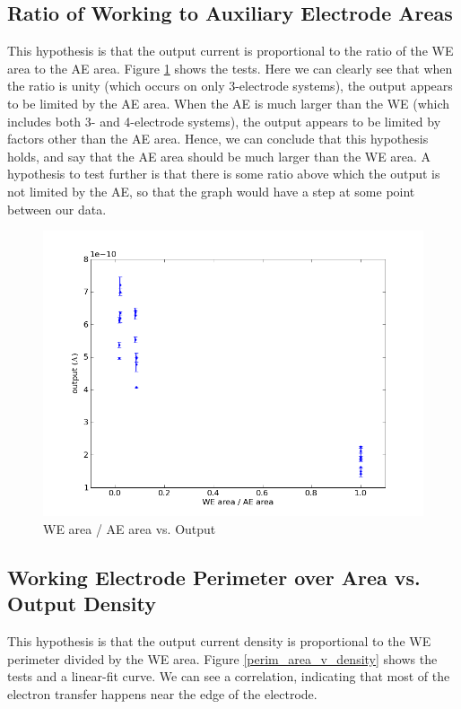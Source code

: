 \subsection{Ratio of Working to Auxiliary Electrode Areas}

This hypothesis is that the output current is proportional to the ratio of the WE area to the AE area. Figure \ref{area_ratio_v_output} shows the tests. Here we can clearly see that when the ratio is unity (which occurs on only 3-electrode systems), the output appears to be limited by the AE area. When the AE is much larger than the WE (which includes both 3- and 4-electrode systems), the output appears to be limited by factors other than the AE area. Hence, we can conclude that this hypothesis holds, and say that the AE area should be much larger than the WE area. A hypothesis to test further is that there is some ratio above which the output is not limited by the AE, so that the graph would have a step at some point between our data.

\begin{figure}
	\centering
	\includegraphics[width=0.7\linewidth]{figures/area_ratio_v_output.png}
	\caption{WE area / AE area vs. Output}
	\label{area_ratio_v_output}
\end{figure}

\subsection{Working Electrode Perimeter over Area vs. Output Density}

This hypothesis is that the output current density is proportional to the WE perimeter divided by the WE area. Figure \ref{perim_area_v_density} shows the tests and a linear-fit curve. We can see a correlation, indicating that most of the electron transfer happens near the edge of the electrode.

